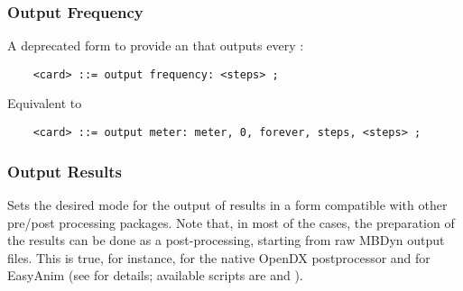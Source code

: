 \subsubsection{Output Frequency}
A deprecated form to provide an  that outputs every
:
\begin{verbatim}
    <card> ::= output frequency: <steps> ;
\end{verbatim}
Equivalent to
\begin{verbatim}
    <card> ::= output meter: meter, 0, forever, steps, <steps> ;
\end{verbatim}

\subsubsection{Output Results}
Sets the desired mode for the output of results in a form
compatible with other pre/post processing packages.
Note that, in most of the cases, the preparation of the 
results can be done as a post-processing, starting from
raw MBDyn output files.
This is true, for instance, for the native OpenDX postprocessor 
and for EasyAnim (see
for details; available scripts are 
and ).

